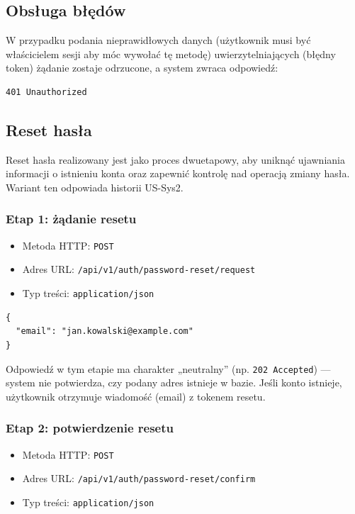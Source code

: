 \documentclass[11pt, a4paper]{article}
\begin{document}
\subsection{Obsługa błędów}

W przypadku podania nieprawidłowych danych (użytkownik musi być właścicielem sesji aby móc wywołać tę metodę) uwierzytelniających (błędny token) żądanie zostaje odrzucone, a system zwraca odpowiedź:

\begin{lstlisting}[style=http,caption={Odpowiedź HTTP — błędna autoryzacja}]
401 Unauthorized
\end{lstlisting}
\subsection{Reset hasła}
Reset hasła realizowany jest jako proces dwuetapowy, aby uniknąć ujawniania informacji o istnieniu konta oraz zapewnić kontrolę nad operacją zmiany hasła.
Wariant ten odpowiada historii US-Sys2.

\subsubsection{Etap 1: żądanie resetu}
\begin{itemize}
    \item Metoda HTTP: \texttt{POST}
    \item Adres URL: \texttt{/api/v1/auth/password-reset/request}
    \item Typ treści: \texttt{application/json}
\end{itemize}

\begin{lstlisting}[style=json,caption={Ciało żądania — żądanie resetu hasła}]
{
  "email": "jan.kowalski@example.com"
}
\end{lstlisting}

Odpowiedź w tym etapie ma charakter „neutralny” (np. \texttt{202 Accepted}) --- system nie potwierdza, czy podany adres istnieje w bazie. Jeśli konto istnieje, użytkownik otrzymuje wiadomość (email) z tokenem resetu.

\subsubsection{Etap 2: potwierdzenie resetu}
\begin{itemize}
    \item Metoda HTTP: \texttt{POST}
    \item Adres URL: \texttt{/api/v1/auth/password-reset/confirm}
    \item Typ treści: \texttt{application/json}
\end{itemize}
\end{document}
